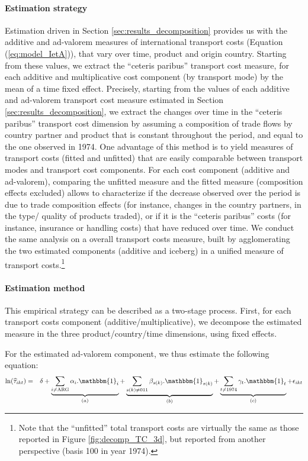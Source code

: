 \documentclass[a4paper,11pt]{article}
\begin{document}
\paragraph{Estimation strategy} Estimation driven in Section \ref{sec:results_decomposition} provides us with the additive and ad-valorem measures of international transport costs (Equation (\ref{eq:model_IetA})), that vary over time, product and origin country. Starting from these values, we extract the ``ceteris paribus'' transport cost measure, for each additive and multiplicative cost component (by transport mode) by the mean of a time fixed effect. Precisely, starting from the values of each additive and ad-valorem transport cost measure estimated in Section \ref{sec:results_decomposition}, we extract the changes over time in the ``ceteris paribus'' transport cost dimension by assuming a composition of trade flows by country partner and product that is constant throughout the period, and equal to the one observed in 1974. One advantage of this method is to yield measures of transport costs (fitted and unfitted) that are easily comparable between transport modes and transport cost components.
For each cost component (additive and ad-valorem), comparing the unfitted measure and the fitted measure (composition effects excluded) allows to characterize if the decrease observed over the period is due to trade composition effects (for instance, changes in the country partners, in the type/ quality of products traded), or if it is the ``ceteris paribus'' costs (for instance, insurance or handling costs) that have reduced over time. We conduct the same analysis on a overall transport costs measure, built by agglomerating the two estimated components (additive and iceberg) in a unified measure of transport costs.\footnote{Note that the ``unfitted'' total transport costs are virtually the same as those reported in Figure \ref{fig:decomp_TC_3d}, but reported from another perspective (basis 100 in year 1974).}


\paragraph{Estimation method} This empirical strategy can be described as a two-stage process. First, for each transport costs component (additive/multiplicative), we decompose the estimated measure in the three product/country/time dimensions, using fixed effects.

For the estimated ad-valorem component, we thus estimate the following equation:
\begin{eqnarray}
\ln(\widehat{\tau}_{ikt})&=&\delta +\underbrace{\sum_{i \neq \text{ARG}}\alpha_i.\mathbbm{1}_i}_{(a)} + \underbrace{\sum_{s(k)\neq \text{011}}\beta_{s(k)}.\mathbbm{1}_{s(k)}}_{(b)} + \underbrace{\sum_{t \neq 1974}\gamma_t.\mathbbm{1}_t}_{(c)}+\epsilon_{ikt} \label{eq:compeffects_mult}
\end{eqnarray}
\end{document}
